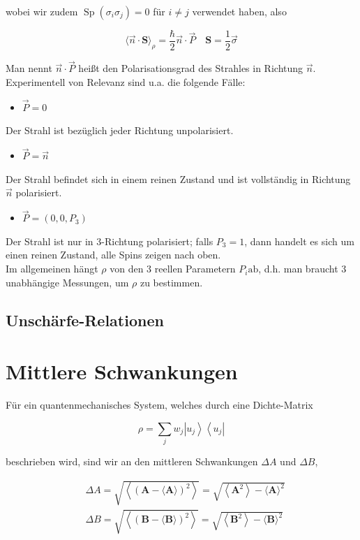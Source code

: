 \documentclass[10pt, letterpaper]{article}
\begin{document}
wobei wir zudem $\operatorname{Sp}\left(\sigma_{i} \sigma_{j}\right)=0$ für $i \neq j$ verwendet haben, also

$$
\langle\vec{n} \cdot \mathbf{S}\rangle_{\rho}=\frac{\hbar}{2} \vec{n} \cdot \vec{P} \quad \mathbf{S}=\frac{1}{2} \vec{\sigma}
$$

Man nennt $\vec{n} \cdot \vec{P}$ heißt den Polarisationsgrad des Strahles in Richtung $\vec{n}$. Experimentell von Relevanz sind u.a. die folgende Fälle:

\begin{itemize}
  \item $\vec{P}=0$
\end{itemize}

Der Strahl ist bezüglich jeder Richtung unpolarisiert.

\begin{itemize}
  \item $\vec{P}=\vec{n}$
\end{itemize}

Der Strahl befindet sich in einem reinen Zustand und ist vollständig in Richtung $\vec{n}$ polarisiert.

\begin{itemize}
  \item $\vec{P}=\left(0,0, P_{3}\right)$
\end{itemize}

Der Strahl ist nur in 3-Richtung polarisiert; falls $P_{3}=1$, dann handelt es sich um einen reinen Zustand, alle Spins zeigen nach oben.\\
Im allgemeinen hängt $\rho$ von den 3 reellen Parametern $P_{i} \mathrm{ab}$, d.h. man braucht 3 unabhängige Messungen, um $\rho$ zu bestimmen.

\subsection*{Unschärfe-Relationen}
\section*{Mittlere Schwankungen}
Für ein quantenmechanisches System, welches durch eine Dichte-Matrix

$$
\rho=\sum_{j} w_{j}\left|u_{j}\right\rangle\left\langle u_{j}\right|
$$

beschrieben wird, sind wir an den mittleren Schwankungen $\Delta A$ und $\Delta B$,

$$
\begin{aligned}
& \Delta A=\sqrt{\left\langle(\mathbf{A}-\langle\mathbf{A}\rangle)^{2}\right\rangle}=\sqrt{\left\langle\mathbf{A}^{2}\right\rangle-\langle\mathbf{A}\rangle^{2}} \\
& \Delta B=\sqrt{\left\langle(\mathbf{B}-\langle\mathbf{B}\rangle)^{2}\right\rangle}=\sqrt{\left\langle\mathbf{B}^{2}\right\rangle-\langle\mathbf{B}\rangle^{2}}
\end{aligned}
$$
\end{document}

